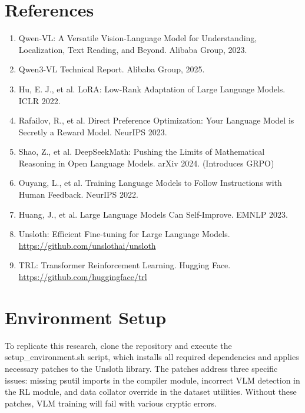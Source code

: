 \documentclass[11pt,a4paper]{article}
\begin{document}
\section*{References}

\begin{enumerate}
    \item Qwen-VL: A Versatile Vision-Language Model for Understanding, Localization, Text Reading, and Beyond. Alibaba Group, 2023.
    
    \item Qwen3-VL Technical Report. Alibaba Group, 2025.
    
    \item Hu, E. J., et al. LoRA: Low-Rank Adaptation of Large Language Models. ICLR 2022.
    
    \item Rafailov, R., et al. Direct Preference Optimization: Your Language Model is Secretly a Reward Model. NeurIPS 2023.
    
    \item Shao, Z., et al. DeepSeekMath: Pushing the Limits of Mathematical Reasoning in Open Language Models. arXiv 2024. (Introduces GRPO)
    
    \item Ouyang, L., et al. Training Language Models to Follow Instructions with Human Feedback. NeurIPS 2022.
    
    \item Huang, J., et al. Large Language Models Can Self-Improve. EMNLP 2023.
    
    \item Unsloth: Efficient Fine-tuning for Large Language Models. \url{https://github.com/unslothai/unsloth}
    
    \item TRL: Transformer Reinforcement Learning. Hugging Face. \url{https://github.com/huggingface/trl}
\end{enumerate}


\appendix

\section{Environment Setup}

To replicate this research, clone the repository and execute the setup\_environment.sh script, which installs all required dependencies and applies necessary patches to the Unsloth library. The patches address three specific issues: missing psutil imports in the compiler module, incorrect VLM detection in the RL module, and data collator override in the dataset utilities. Without these patches, VLM training will fail with various cryptic errors.
\end{document}
